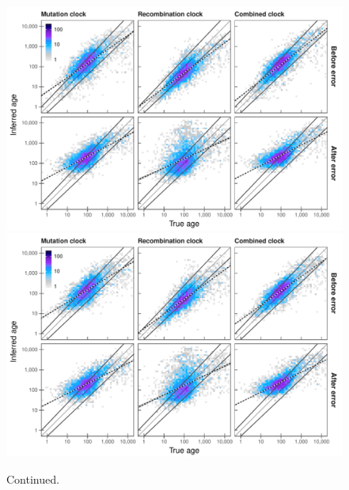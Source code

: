

\begin{figure}[p]
\ContinuedFloat
{\small{}} \\
\includegraphics[width=\textwidth]{./img/ch5/generror_scat_fgtH}
{\small{}} \\
\includegraphics[width=\textwidth]{./img/ch5/generror_scat_fgtP}
\caption[]{Continued.}
\label{fig:generror_scat_fgt}
\end{figure}
